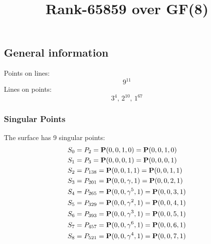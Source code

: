 \documentclass{article}
\newcommand\setTBstruts{\def\T{\rule{0pt}{2.6ex}}%
\def\B{\rule[-1.2ex]{0pt}{0pt}}}
\newcommand{\bP}{{\bf P}}
\begin{document}
 
\setTBstruts



{\allowdisplaybreaks%






\title{Rank-65859 over GF(8)}
\author{}%
\maketitle%
%
{}



\subsection*{General information}
Points on lines:
$$
9^{11}$$
Lines on points:
$$
3^4,\,2^{10},\,1^{67}$$
\subsubsection*{Singular Points}
The surface has 9 singular points:\\
\begin{align*}
S_{0} &= P_{2}=\bP(0, 0, 1, 0) = \bP(0, 0, 1, 0)\\
S_{1} &= P_{3}=\bP(0, 0, 0, 1) = \bP(0, 0, 0, 1)\\
S_{2} &= P_{138}=\bP(0, 0, 1, 1) = \bP(0, 0, 1, 1)\\
S_{3} &= P_{201}=\bP(0, 0, \gamma , 1) = \bP(0, 0, 2, 1)\\
S_{4} &= P_{265}=\bP(0, 0, \gamma^{5}, 1) = \bP(0, 0, 3, 1)\\
S_{5} &= P_{329}=\bP(0, 0, \gamma^{2}, 1) = \bP(0, 0, 4, 1)\\
S_{6} &= P_{393}=\bP(0, 0, \gamma^{3}, 1) = \bP(0, 0, 5, 1)\\
S_{7} &= P_{457}=\bP(0, 0, \gamma^{6}, 1) = \bP(0, 0, 6, 1)\\
S_{8} &= P_{521}=\bP(0, 0, \gamma^{4}, 1) = \bP(0, 0, 7, 1)\\
\end{align*}
}
\end{document}
